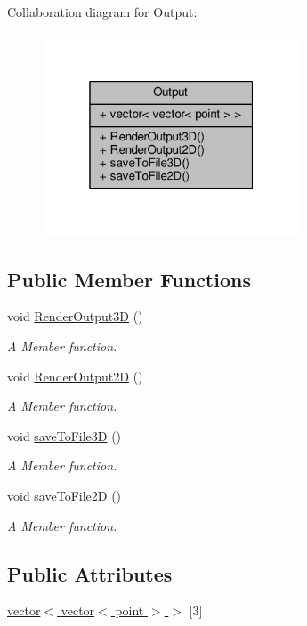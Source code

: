 Collaboration diagram for Output\+:
\nopagebreak
\begin{figure}[H]
\begin{center}
\leavevmode
\includegraphics[width=217pt]{classOutput__coll__graph}
\end{center}
\end{figure}
\subsection*{Public Member Functions}
\begin{DoxyCompactItemize}
\item 
void \hyperlink{classOutput_a50c6da843dbf27d6238ed07082b31839}{Render\+Output3D} ()
\begin{DoxyCompactList}\small\item\em A Member function. \end{DoxyCompactList}\item 
void \hyperlink{classOutput_a9766c258cad838c5779e0abc778a530d}{Render\+Output2D} ()
\begin{DoxyCompactList}\small\item\em A Member function. \end{DoxyCompactList}\item 
void \hyperlink{classOutput_aa16a2893d743f7c218c026efa3e65718}{save\+To\+File3D} ()
\begin{DoxyCompactList}\small\item\em A Member function. \end{DoxyCompactList}\item 
void \hyperlink{classOutput_aa9ea0df4774ce32a319bdb1b3a6712a8}{save\+To\+File2D} ()
\begin{DoxyCompactList}\small\item\em A Member function. \end{DoxyCompactList}\end{DoxyCompactItemize}
\subsection*{Public Attributes}
\begin{DoxyCompactItemize}
\item 
\hyperlink{classOutput_a108ca6c08cfc8a442fac5f1dc864a481}{vector$<$ vector$<$ point $>$ $>$} \mbox{[}3\mbox{]}
\end{DoxyCompactItemize}


